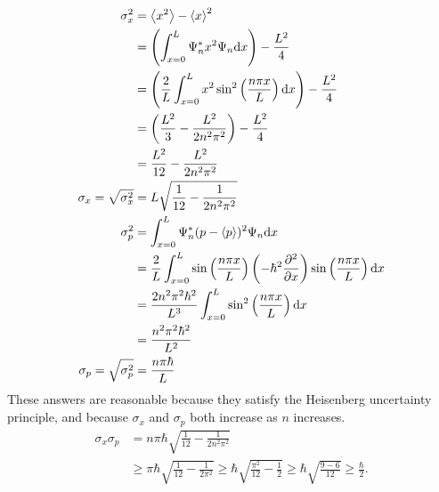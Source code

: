 \documentclass{article}
\begin{document}
\bigskip
\noindent{}\bigskip\par
\begin{align*}
    \sigma_x^2 &= \left\langle x^2 \right\rangle - \left\langle x \right\rangle^2 \\
               &= \left( \int_{x=0}^L \Psi_n^* x^2 \Psi_n \mathrm{d} x  \right) - \frac{L^2}{4} \\
               &= \left( \frac{2}{L} \int_{x=0}^L x^2 \sin^2 \left( \frac{n \pi x}{L} \right)  \mathrm{d} x  \right) - \frac{L^2}{4} \\
               &= \left( \frac{L^2}{3} - \frac{L^2}{2 n^2 \pi^2} \right)  - \frac{L^2}{4} \\
               &= \frac{L^2}{12} - \frac{L^2}{2 n^2 \pi^2} \\
    \sigma_x = \sqrt{\sigma_x^2} &= L \sqrt{\frac{1}{12} - \frac{1}{2 n^2 \pi^2}} \\
    \sigma_p^2 &= \int_{x=0}^L \Psi_n^* (p-\left\langle p \right\rangle)^2 \Psi_n \mathrm{d} x \\
               &= \frac{2}{L} \int_{x=0}^L \sin \left( \frac{n \pi x}{L} \right) \left( -\hbar^2 \frac{\partial^2}{\partial x} \right) \sin \left( \frac{n \pi x}{L} \right) \mathrm{d} x \\
               &= \frac{2n^2\pi^2\hbar^2}{L^3} \int_{x=0}^L \sin^2 \left( \frac{n \pi x}{L} \right) \mathrm{d} x \\
               &= \frac{n^2\pi^2\hbar^2}{L^2} \\
    \sigma_p = \sqrt{\sigma_p^2} &= \frac{n\pi \hbar}{L}
\end{align*}
These answers are reasonable because they satisfy the Heisenberg uncertainty principle, and because $\sigma_x$ and $\sigma_p$ both increase as $n$ increases.
\begin{align*}
    \sigma_x \sigma_p &= n \pi \hbar \sqrt{ \frac{1}{12} - \frac{1}{2 n^2 \pi^2}} \\
                      &\geq \pi \hbar \sqrt{ \frac{1}{12} - \frac{1}{2 \pi^2}} \geq \hbar \sqrt{ \frac{\pi^2}{12} - \frac{1}{2}} \geq \hbar \sqrt{ \frac{9-6}{12}} \geq \frac{\hbar}{2}.
\end{align*}
\end{document}
